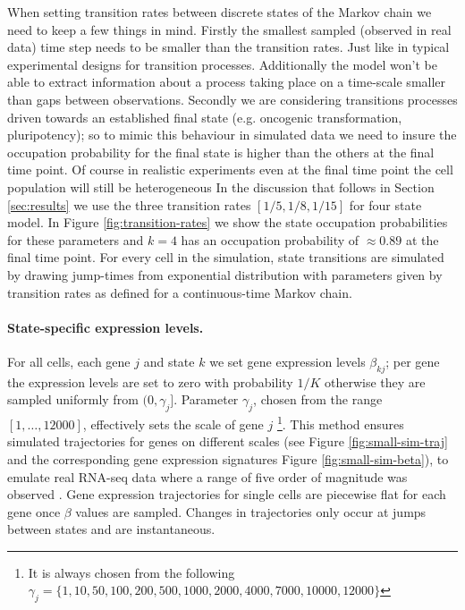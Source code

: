 When setting transition rates between discrete states of the Markov chain we need to keep a few things in mind. Firstly the smallest sampled (observed in real data) time step needs to be smaller than the transition rates. Just like in typical experimental designs for transition processes. Additionally the model won't be able to extract information about a process taking place on a time-scale smaller than gaps between observations. Secondly we are considering transitions processes driven towards an established final state (e.g. oncogenic transformation, pluripotency); so to mimic this behaviour in simulated data we need to insure the occupation probability for the final state is higher than the others at the final time point. Of course in realistic experiments even at the final time point the cell population will still be heterogeneous In the discussion that follows in Section \ref{sec:results} we use the three transition rates $[1/5, 1/8, 1/15]$ for four state model. In Figure \ref{fig:transition-rates} we show the state occupation probabilities for these parameters and $k=4$ has an occupation probability of $\approx 0.89$ at the final time point. For every cell in the simulation, state transitions are simulated by drawing jump-times from exponential distribution with parameters given by transition rates as defined for a continuous-time Markov chain.

\paragraph{State-specific expression levels.}
\label{sec:state-spec-expr}
For all cells, each gene $j$ and state $k$ we set gene expression levels $\beta_{kj}$; per gene the expression levels are set to zero with probability $1/K$ otherwise they are sampled uniformly from $(0, \gamma_j]$. Parameter $\gamma_j$, chosen from the range $[1, \ldots, 12000]$, effectively sets the scale of gene $j$ \footnote{It is always chosen from the following $\gamma_j = \lbrace 1, 10, 50, 100, 200, 500, 1000, 2000, 4000, 7000, 10000, 12000 \rbrace$}. This method ensures simulated trajectories for genes on different scales (see Figure \ref{fig:small-sim-traj} and the corresponding gene expression signatures Figure \ref{fig:small-sim-beta}), to emulate real RNA-seq data  where a range of five order of magnitude was observed \citep{Wang:2009ur,Mortazavi:2008jj}. Gene expression trajectories for single cells are piecewise flat for each gene once $\beta$ values are sampled. Changes in trajectories only occur at jumps between states and are instantaneous.

